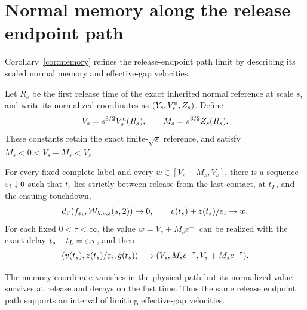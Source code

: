 \section{Normal memory along the release endpoint path}
\label{sec:memory}

Corollary~\ref{cor:memory} refines the release-endpoint path limit by
describing its scaled normal memory and effective-gap velocities.

Let $R_s$ be the first release time of the exact inherited normal
reference at scale $s$, and write its normalized coordinates as
$(Y_s,V_s^{\rm n},Z_s)$. Define
\begin{equation}
 V_s=s^{3/2}V_s^{\rm n}(R_s),\qquad
 M_s=s^{3/2}Z_s(R_s).
 \label{eq:path-memory-constants}
\end{equation}
These constants retain the exact finite-$\sqrt s$ reference, and
satisfy $M_s<0<V_s+M_s<V_s$.

\begin{corollary}
\label{cor:memory}
For every fixed complete label and every
$w\in[V_s+M_s,V_s]$, there is a sequence $\varepsilon_i\downarrow0$
such that $t_s$ lies strictly between release from the last contact, at $t_L$,
and the ensuing touchdown,
\[
 d_{\mathrm F}(f_{\varepsilon_i},\mathcal W_{\lambda,\nu,s}(s,2))\to0,
 \qquad v(t_s)+z(t_s)/\varepsilon_i\to w.
\]
For each fixed $0<\tau<\infty$, the value
$w=V_s+M_s e^{-\tau}$ can be realized with the exact delay
$t_s-t_L=\varepsilon_i\tau$, and then
\begin{equation}
 (v(t_s),z(t_s)/\varepsilon_i,\dot g(t_s))
          \longrightarrow(V_s,M_s e^{-\tau},V_s+M_s e^{-\tau}).
 \label{eq:path-memory-limits}
\end{equation}
\end{corollary}

The memory coordinate vanishes in the physical path but its normalized
value survives at release and decays on the fast time. Thus the same
release endpoint path supports an interval of limiting effective-gap
velocities.


